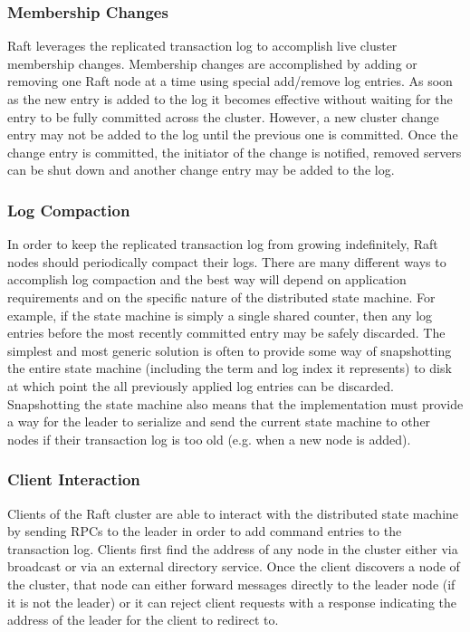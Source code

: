 \documentclass{acmtog} %
\begin{document}
\subsubsection{Membership Changes}

Raft leverages the replicated transaction log to accomplish live
cluster membership changes. Membership changes are accomplished by
adding or removing one Raft node at a time using special add/remove
log entries. As soon as the new entry is added to the log it becomes
effective without waiting for the entry to be fully committed across
the cluster. However, a new cluster change entry may not be added to
the log until the previous one is committed. Once the change entry is
committed, the initiator of the change is notified, removed servers
can be shut down and another change entry may be added to the log.

\subsubsection{Log Compaction}

In order to keep the replicated transaction log from growing
indefinitely, Raft nodes should periodically compact their logs. There
are many different ways to accomplish log compaction and the best way
will depend on application requirements and on the specific nature of
the distributed state machine. For example, if the state machine is
simply a single shared counter, then any log entries before the most
recently committed entry may be safely discarded. The simplest and
most generic solution is often to provide some way of snapshotting the
entire state machine (including the term and log index it represents)
to disk at which point the all previously applied log entries can be
discarded. Snapshotting the state machine also means that the
implementation must provide a way for the leader to serialize and send
the current state machine to other nodes if their transaction log is
too old (e.g. when a new node is added).

\subsubsection{Client Interaction}

Clients of the Raft cluster are able to interact with the distributed
state machine by sending RPCs to the leader in order to add command
entries to the transaction log. Clients first find the address of any
node in the cluster either via broadcast or via an external directory
service. Once the client discovers a node of the cluster, that node
can either forward messages directly to the leader node (if it is not
the leader) or it can reject client requests with a response
indicating the address of the leader for the client to redirect to.
\end{document}
